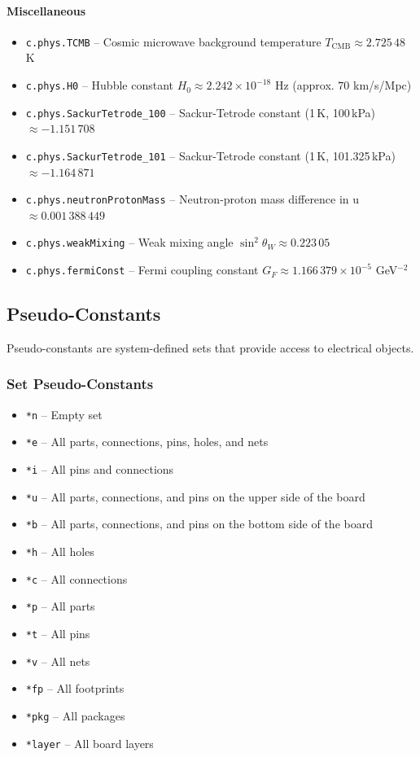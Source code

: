 \paragraph{Miscellaneous}
\begin{itemize}
\item \texttt{c.phys.TCMB} -- Cosmic microwave background temperature $T_{\text{CMB}} \approx 2.725\,48$ K
\item \texttt{c.phys.H0} -- Hubble constant $H_0 \approx 2.242 \times 10^{-18}$ Hz (approx. $70$ km/s/Mpc)
\item \texttt{c.phys.SackurTetrode\_100} -- Sackur-Tetrode constant (1\,K, 100\,kPa) $\approx -1.151\,708$
\item \texttt{c.phys.SackurTetrode\_101} -- Sackur-Tetrode constant (1\,K, 101.325\,kPa) $\approx -1.164\,871$
\item \texttt{c.phys.neutronProtonMass} -- Neutron-proton mass difference in u $\approx 0.001\,388\,449$
\item \texttt{c.phys.weakMixing} -- Weak mixing angle $\sin^2\theta_W \approx 0.223\,05$
\item \texttt{c.phys.fermiConst} -- Fermi coupling constant $G_F \approx 1.166\,379 \times 10^{-5}$ GeV$^{-2}$
\end{itemize}

\subsection{Pseudo-Constants}
Pseudo-constants are system-defined sets that provide access to electrical objects.

\subsubsection{Set Pseudo-Constants}
\begin{itemize}
\item \texttt{*n} -- Empty set
\item \texttt{*e} -- All parts, connections, pins, holes, and nets
\item \texttt{*i} -- All pins and connections
\item \texttt{*u} -- All parts, connections, and pins on the upper side of the board
\item \texttt{*b} -- All parts, connections, and pins on the bottom side of the board
\item \texttt{*h} -- All holes
\item \texttt{*c} -- All connections
\item \texttt{*p} -- All parts
\item \texttt{*t} -- All pins
\item \texttt{*v} -- All nets
\item \texttt{*fp} -- All footprints
\item \texttt{*pkg} -- All packages
\item \texttt{*layer} -- All board layers
\end{itemize}

